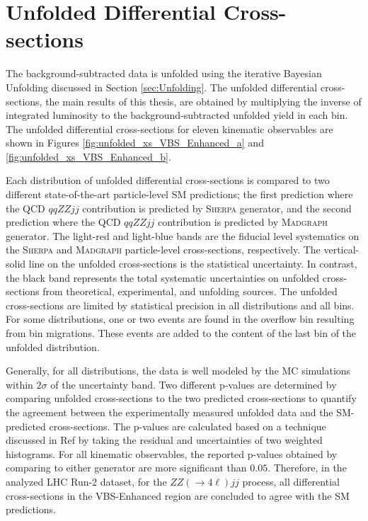 \section{ Unfolded Differential Cross-sections }
\label{sec:DifferentialxS}

The background-subtracted data is unfolded using the iterative Bayesian Unfolding discussed in Section \ref{sec:Unfolding}. The unfolded differential cross-sections, the main results of this thesis, are obtained by multiplying the inverse of integrated luminosity to the background-subtracted unfolded yield in each bin. The unfolded differential cross-sections for eleven kinematic observables are shown in Figures \ref{fig:unfolded_xs_VBS_Enhanced_a} and \ref{fig:unfolded_xs_VBS_Enhanced_b}. 

Each distribution of unfolded differential cross-sections is compared to two different state-of-the-art particle-level SM predictions; the first prediction where the QCD $qqZZjj$ contribution is predicted by \textsc{Sherpa} generator, and the second prediction where the QCD $qqZZjj$ contribution is predicted by \textsc{Madgraph} generator. The light-red and light-blue bands are the fiducial level systematics on the \textsc{Sherpa} and \textsc{Madgraph} particle-level cross-sections, respectively. The vertical-solid line on the unfolded cross-sections is the statistical uncertainty. In contrast, the black band represents the total systematic uncertainties on unfolded cross-sections from theoretical, experimental, and unfolding sources. The unfolded cross-sections are limited by statistical precision in all distributions and all bins. For some distributions, one or two events are found in the overflow bin resulting from bin migrations. These events are added to the content of the last bin of the unfolded distribution. 

Generally, for all distributions, the data is well modeled by the MC simulations within $2\sigma$ of the uncertainty band. Two different p-values are determined by comparing unfolded cross-sections to the two predicted cross-sections to quantify the agreement between the experimentally measured unfolded data and the SM-predicted cross-sections. The p-values are calculated based on a technique discussed in Ref\cite{pValueStat} by taking the residual and uncertainties of two weighted histograms. For all kinematic observables, the reported p-values obtained by comparing to either generator are more significant than $0.05$. Therefore, in the analyzed LHC Run-2 dataset, for the $ZZ (\rightarrow 4 \ell) jj$ process, all differential cross-sections in the VBS-Enhanced region are concluded to agree with the SM predictions. 

